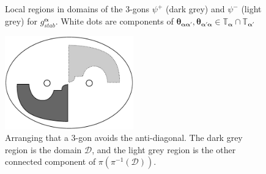 \documentclass[11pt]{article}
\theoremstyle{plain} \newtheorem{thm}{Theorem}[subsection]
\theoremstyle{plain} \newtheorem{cor}[thm]{Corollary}
\theoremstyle{plain} \newtheorem{prop}[thm]{Proposition}
\theoremstyle{plain} \newtheorem{conj}[thm]{Conjecture}
\theoremstyle{plain} \newtheorem{lem}[thm]{Lemma}
\theoremstyle{definition} \newtheorem{df}[thm]{Definition}
\theoremstyle{remark} \newtheorem{rmk}[thm]{Remark}
\theoremstyle{remark} \newtheorem{obs}[thm]{Observation}
\newcommand{\ba}{\boldsymbol{\alpha}}
\newcommand{\thet}[1]{\boldsymbol{\theta}_{#1}}
\newcommand{\tor}[1]{\mathbb{T}_{#1}}
\begin{document}
\begin{figure}[h!]
\centering
{}\qquad
{}
\caption[Local components of 3-gon domains associated to the second handleslide for $b \mapsto b \sigma_{2n}$]{Local regions in domains of the 3-gons $\psi^+$ (dark grey) and $\psi^-$ (light grey) for $g_{stab}^{\ba}$. White dots are components of $\thet{\ba \ba'},\thet{\ba'\ba} \in \tor{\ba} \cap \tor{\ba'}$ \label{fig:movestabhs2}}
\end{figure}

\begin{figure}[h!]
\centering
\includegraphics[height = 40mm]{StabTriAD1}
\caption[Avoiding the anti-diagonal]{Arranging that a 3-gon avoids the anti-diagonal.  The dark grey region is the domain $\mathcal{D}$, and the light grey region is the other connected component of $\pi(\pi^{-1}(\mathcal{D}))$. \label{fig:stabtriad}}
\end{figure}
\end{document}
